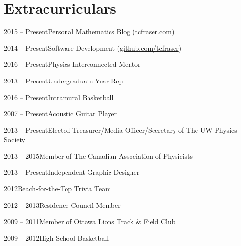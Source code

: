 \documentclass{article}
\begin{document}
    \section{Extracurriculars}
    \begin{extralist}
        \item{2015 -- Present}{Personal Mathematics Blog (\href{http://tcfraser.com/}{tcfraser.com})}
        \item{2014 -- Present}{Software Development (\href{https://github.com/tcfraser}{github.com/tcfraser})}
        \item{2016 -- Present}{Physics Interconnected Mentor}
        \item{2013 -- Present}{Undergraduate Year Rep}
        \item{2016 -- Present}{Intramural Basketball}
        \item{2007 -- Present}{Acoustic Guitar Player}
        \item{2013 -- Present}{Elected Treasurer/Media Officer/Secretary of The UW Physics Society}
        \item{2013 -- 2015}{Member of The Canadian Association of Physicists}
        \item{2013 -- Present}{Independent Graphic Designer}
        \item{2012}{Reach-for-the-Top Trivia Team}
        \item{2012 -- 2013}{Residence Council Member}
        \item{2009 -- 2011}{Member of Ottawa Lions Track \& Field Club}
        \item{2009 -- 2012}{High School Basketball}
    \end{extralist}
\end{document}
